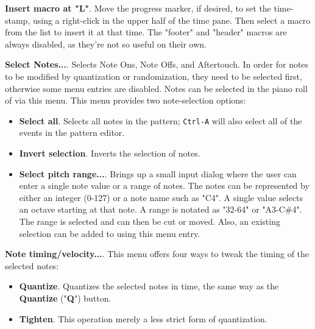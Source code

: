    \begin{enumber}
      \item \textbf{Insert macro at "L"}.
         Move the progress marker, if desired, to set the time-stamp,
         using a right-click in the upper half of the time pane.
         Then select a macro from the list to insert it at that time.
         The "footer" and "header" macros are always disabled, as they're
         not so useful on their own.
      \item \textbf{Select Notes...}.
      Selects Note Ons, Note Offs, and Aftertouch.
      In order for notes to be modified by quantization or randomization,
      they need to be selected first, otherwise some menu entries are
      disabled.
      Notes can be selected in the piano roll of via this menu.
      This menu provides two note-selection options:
         \begin{itemize}
            \item \textbf{Select all}.
               Selects all notes in the pattern;
                \texttt{Ctrl-A} will also select
               all of the events in the pattern editor.
            \item \textbf{Invert selection}.
               Inverts the selection of notes.
            \item \textbf{Select pitch range...}. 
               Brings up a small input dialog where the user can enter a single
               note value or a range of notes.
               The notes can be represented by either an integer (0-127)
               or a note name such as "C4".
               A single value selects an octave starting at that note.
               A range is notated as "32-64" or "A3-C\#4".
               The range is selected and can then be cut or moved.
               Also, an existing selection can be added to using
               this menu entry.
         \end{itemize}
      \item \textbf{Note timing/velocity...}.
         This menu offers four ways to tweak the timing of the selected notes:
         \begin{itemize}
            \item \textbf{Quantize}.
               Quantizes the selected notes in time, the same way as the
               \textbf{Quantize} ("\textbf{Q}") button.
            \item \textbf{Tighten}.
               This operation merely a less strict form of quantization.

\end{itemize}
\end{enumber}
